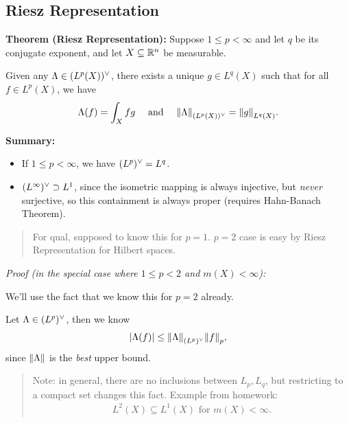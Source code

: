\hypertarget{riesz-representation}{%
\subsection{Riesz Representation}\label{riesz-representation}}

\textbf{Theorem (Riesz Representation):} Suppose \(1\leq p < \infty\)
and let \(q\) be its conjugate exponent, and let \(X\subseteq {\mathbb{R}}^n\) be
measurable.

Given any \(\Lambda \in (L^p(X))^\vee\), there exists a unique
\(g\in L^q(X)\) such that for all \(f\in L^p(X)\), we have
\begin{align*}
\Lambda(f) = \int_X fg
\quad \text{ and } \quad 
{\left\lVert {\Lambda} \right\rVert}_{(L^p(X))^\vee} = {\left\lVert {g} \right\rVert}_{L^q(X)}
.\end{align*}

\textbf{Summary:}

\begin{itemize}
\tightlist
\item
  If \(1\leq p < \infty\), we have \((L^p)^\vee = L^q\).
\item
  \((L^\infty)^\vee \supset L^1\), since the isometric mapping is always
  injective, but \emph{never} surjective, so this containment is always
  proper (requires Hahn-Banach Theorem).
\end{itemize}

\begin{quote}
For qual, supposed to know this for \(p=1\). \(p=2\) case is easy by
Riesz Representation for Hilbert spaces.
\end{quote}

\emph{Proof (in the special case where \(1\leq p < 2\) and
\(m(X) < \infty\)):}

We'll use the fact that we know this for \(p=2\) already.

Let \(\Lambda \in (L^p)^\vee\), then we know
\begin{align*}
{\left\lvert {\Lambda(f)} \right\rvert} \leq {\left\lVert {\Lambda} \right\rVert}_{(L^p)^\vee} {\left\lVert {f} \right\rVert}_p
,\end{align*} since \({\left\lVert {\Lambda} \right\rVert}\) is the \emph{best} upper bound.

\begin{quote}
Note: in general, there are no inclusions between \(L_p, L_q\), but
restricting to a compact set changes this fact. Example from homework:
\begin{align*}
L^2(X) \subseteq L^1(X) \text{ for } m(X) < \infty
.\end{align*}
\end{quote}

